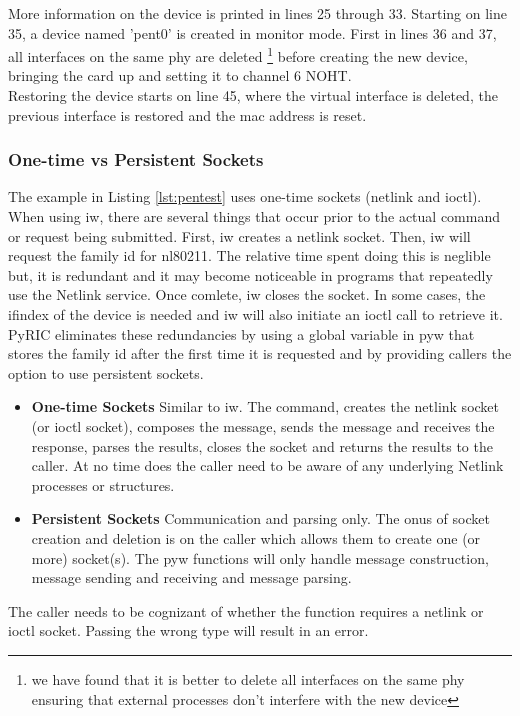 \documentclass[11pt]{article}
\begin{document}
More information on the device is printed in lines 25 through 33. Starting on
line 35, a device named 'pent0' is created in monitor mode. First in lines 36 
and 37, all interfaces on the same phy are deleted \footnote{we have found that
it is better to delete all interfaces on the same phy ensuring that external 
processes don't interfere with the new device} before creating the new device, 
bringing the card up and setting it to channel 6 NOHT.\\ 

Restoring the device starts on line 45, where the virtual interface is deleted,
the previous interface is restored and the mac address is reset.

\subsubsection{One-time vs Persistent Sockets}
The example in Listing \ref{lst:pentest} uses one-time sockets (netlink and 
ioctl). When using iw, there are several things that occur prior to the actual 
command or request being submitted. First, iw creates a netlink socket. Then, 
iw will request the family id for nl80211. The relative time spent doing this 
is neglible but, it is redundant and it may become noticeable in programs that
repeatedly use the Netlink service. Once comlete, iw closes the socket. In some
cases, the ifindex of the device is needed and iw will also initiate an ioctl 
call to retrieve it. PyRIC eliminates these redundancies by using a global 
variable in pyw that stores the family id after the first time it is requested 
and by providing callers the option to use persistent sockets. 
\begin{itemize}
\item \textbf{One-time Sockets} Similar to iw. The command, creates the netlink 
socket (or ioctl socket), composes the message, sends the message and receives 
the response, parses the results, closes the socket and returns the results to 
the caller. At no time does the caller need to be aware of any underlying Netlink 
processes or structures.
\item \textbf{Persistent Sockets} Communication and parsing only. The onus of 
socket creation and deletion is on the caller which allows them to create one 
(or more) socket(s). The pyw functions will only handle message construction, 
message sending and receiving and message parsing.
\end{itemize}
The caller needs to be cognizant of whether the function requires a netlink or
ioctl socket. Passing the wrong type will result in an error. \\
\end{document}
